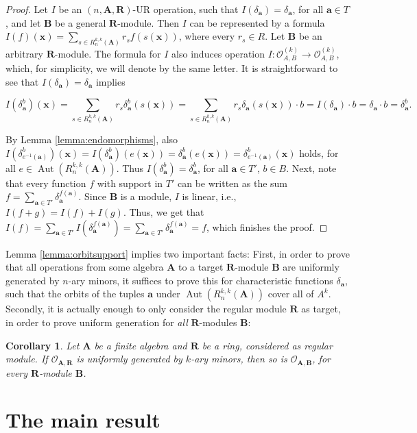 \documentclass[11pt]{amsart}
\theoremstyle{plain}
\newtheorem{corollary}[thm]{Corollary}
\theoremstyle{definition}
\DeclareMathOperator{\Aut}{Aut}
\newcommand{\alg}[1]{\mathbf{#1}}
\newcommand{\clonoid}[1]{\mathcal{#1}}
\newcommand{\clodO}{\clonoid{O}}
\newcommand{\algA}{\alg{A}}
\newcommand{\algB}{\alg{B}}
\newcommand{\algR}{\alg{R}}
\renewcommand\vec{\mathbf}
\newcommand{\va}{\vec{a}}
\newcommand{\vx}{\vec{x}}
\begin{document}
\begin{proof}
Let $I$ be an $(n,\algA,\algR)$-UR operation, such that $I(\delta_\va) = \delta_\va$, for all $\va \in T$, and let $\algB$ be a general $\algR$-module. Then $I$ can be represented by a formula $I(f)(\vx) = \sum_{s \in R_n^{k,k}(\algA)} r_s f(s(\vx))$, where every $r_s \in R$. Let $\algB$ be an arbitrary $\algR$-module. The formula for $I$ also induces operation $I \colon \clodO_{A,B}^{(k)} \to \clodO_{A,B}^{(k)}$, which, for simplicity, we will denote by the same letter. It is straightforward to see that $I(\delta_\va) = \delta_\va$ implies

$$I(\delta_\va^{b})(\vx) = \sum_{s \in R_n^{k,k}(\algA)} r_s \delta_\va^{b}(s(\vx)) = \sum_{s \in R_n^{k,k}(\algA)} r_s \delta_\va(s(\vx)) \cdot b = I(\delta_\va)\cdot b = \delta_\va\cdot b = \delta_{\va}^b.$$

By Lemma \ref{lemma:endomorphisms}, also $I(\delta_{e^{-1}(\va)}^b)(\vx) = I(\delta_\va^b)(e(\vx)) = \delta_\va^b (e(\vx)) = \delta_{e^{-1}(\va)}^b(\vx)$ holds, for all $e \in \Aut(R_n^{k,k}(\algA))$. Thus $I(\delta_\va^b) = \delta_\va^b$, for all $\va \in T'$, $b\in B$. Next, note that every function $f$ with support in $T'$ can be written as the sum $f = \sum_{\va \in T'} \delta_{\va}^{f(\va)}$. Since $\algB$ is a module, $I$ is linear, i.e., $I(f+g) = I(f) + I(g)$. Thus, we get that $I(f) = \sum_{\va \in T'} I(\delta_{\va}^{f(\va)}) = \sum_{\va \in T'} \delta_{\va}^{f(\va)} = f$, which finishes the proof.
\end{proof}

Lemma \ref{lemma:orbitsupport} implies two important facts: First, in order to prove that all operations from some algebra $\algA$ to a target $\algR$-module $\algB$ are uniformly generated by $n$-ary minors, it suffices to prove this for characteristic functions $\delta_\va$, such that the orbits of the tuples $\va$ under $\Aut(R_n^{k,k}(\algA))$ cover all of $A^k$.
Secondly, it is actually enough to only consider the regular module $\algR$ as target, in order to prove uniform generation for \emph{all} $\algR$-modules $\algB$:

\begin{corollary} \label{corollary:orbitsupport}
Let $\algA$ be a finite algebra and $\algR$ be a ring, considered as regular module. If $\clodO_{\algA,\algR}$ is uniformly generated by $k$-ary minors, then so is $\clodO_{\algA,\algB}$, for every $\algR$-module $\algB$.
\end{corollary}


\section{The main result}\label{sec:mainres} 
\end{document}
